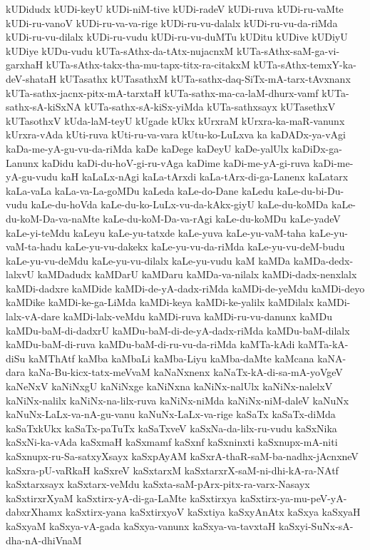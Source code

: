 {kUDidudx
kUDi-keyU
kUDi-niM-tive
kUDi-radeV
kUDi-ruva
kUDi-ru-vaMte
kUDi-ru-vanoV
kUDi-ru-va-va-rige
kUDi-ru-vu-dalalx
kUDi-ru-vu-da-riMda
kUDi-ru-vu-dilalx
kUDi-ru-vudu
kUDi-ru-vu-duMTu
kUDitu
kUDive
kUDiyU
kUDiye
kUDu-vudu
kUTa-sAthx-da-tAtx-nujacnxM
kUTa-sAthx-saM-ga-vi-garxhaH
kUTa-sAthx-takx-tha-mu-tapx-titx-ra-citakxM
kUTa-sAthx-temxY-ka-deV-shataH
kUTasathx
kUTasathxM
kUTa-sathx-daq-SiTx-mA-tarx-tAvxnanx
kUTa-sathx-jacnx-pitx-mA-tarxtaH
kUTa-sathx-ma-ca-laM-dhurx-vamf
kUTa-sathx-sA-kiSxNA
kUTa-sathx-sA-kiSx-yiMda
kUTa-sathxsayx
kUTasethxV
kUTasothxV
kUda-laM-teyU
kUgade
kUkx
kUrxraM
kUrxra-ka-maR-vanunx
kUrxra-vAda
kUti-ruva
kUti-ru-va-vara
kUtu-ko-LuLxva
ka
kaDADx-ya-vAgi
kaDa-me-yA-gu-vu-da-riMda
kaDe
kaDege
kaDeyU
kaDe-yalUlx
kaDiDx-ga-Lanunx
kaDidu
kaDi-du-hoV-gi-ru-vAga
kaDime
kaDi-me-yA-gi-ruva
kaDi-me-yA-gu-vudu
kaH
kaLaLx-nAgi
kaLa-tArxdi
kaLa-tArx-di-ga-Lanenx
kaLatarx
kaLa-vaLa
kaLa-va-La-goMDu
kaLeda
kaLe-do-Dane
kaLedu
kaLe-du-bi-Du-vudu
kaLe-du-hoVda
kaLe-du-ko-LuLx-vu-da-kAkx-giyU
kaLe-du-koMDa
kaLe-du-koM-Da-va-naMte
kaLe-du-koM-Da-va-rAgi
kaLe-du-koMDu
kaLe-yadeV
kaLe-yi-teMdu
kaLeyu
kaLe-yu-tatxde
kaLe-yuva
kaLe-yu-vaM-taha
kaLe-yu-vaM-ta-hadu
kaLe-yu-vu-dakekx
kaLe-yu-vu-da-riMda
kaLe-yu-vu-deM-budu
kaLe-yu-vu-deMdu
kaLe-yu-vu-dilalx
kaLe-yu-vudu
kaM
kaMDa
kaMDa-dedx-lalxvU
kaMDadudx
kaMDarU
kaMDaru
kaMDa-va-nilalx
kaMDi-dadx-nenxlalx
kaMDi-dadxre
kaMDide
kaMDi-de-yA-dadx-riMda
kaMDi-de-yeMdu
kaMDi-deyo
kaMDike
kaMDi-ke-ga-LiMda
kaMDi-keya
kaMDi-ke-yalilx
kaMDilalx
kaMDi-lalx-vA-dare
kaMDi-lalx-veMdu
kaMDi-ruva
kaMDi-ru-vu-danunx
kaMDu
kaMDu-baM-di-dadxrU
kaMDu-baM-di-de-yA-dadx-riMda
kaMDu-baM-dilalx
kaMDu-baM-di-ruva
kaMDu-baM-di-ru-vu-da-riMda
kaMTa-kAdi
kaMTa-kA-diSu
kaMThAtf
kaMba
kaMbaLi
kaMba-Liyu
kaMba-daMte
kaMcana
kaNA-dara
kaNa-Bu-kicx-tatx-meVvaM
kaNaNxnenx
kaNaTx-kA-di-sa-mA-yoVgeV
kaNeNxV
kaNiNxgU
kaNiNxge
kaNiNxna
kaNiNx-nalUlx
kaNiNx-nalelxV
kaNiNx-nalilx
kaNiNx-na-lilx-ruva
kaNiNx-niMda
kaNiNx-niM-daleV
kaNuNx
kaNuNx-LaLx-va-nA-gu-vanu
kaNuNx-LaLx-va-rige
kaSaTx
kaSaTx-diMda
kaSaTxkUkx
kaSaTx-paTuTx
kaSaTxveV
kaSxNa-da-lilx-ru-vudu
kaSxNika
kaSxNi-ka-vAda
kaSxmaH
kaSxmamf
kaSxnf
kaSxninxti
kaSxnupx-mA-niti
kaSxnupx-ru-Sa-satxyXsayx
kaSxpAyAM
kaSxrA-thaR-saM-ba-nadhx-jAcnxneV
kaSxra-pU-vaRkaH
kaSxreV
kaSxtarxM
kaSxtarxrX-saM-ni-dhi-kA-ra-NAtf
kaSxtarxsayx
kaSxtarx-veMdu
kaSxta-saM-pArx-pitx-ra-varx-Nasayx
kaSxtirxrXyaM
kaSxtirx-yA-di-ga-LaMte
kaSxtirxya
kaSxtirx-ya-mu-peV-yA-dabxrXhamx
kaSxtirx-yana
kaSxtirxyoV
kaSxtiya
kaSxyAnAtx
kaSxya
kaSxyaH
kaSxyaM
kaSxya-vA-gada
kaSxya-vanunx
kaSxya-va-tavxtaH
kaSxyi-SuNx-sA-dha-nA-dhiVnaM
}
